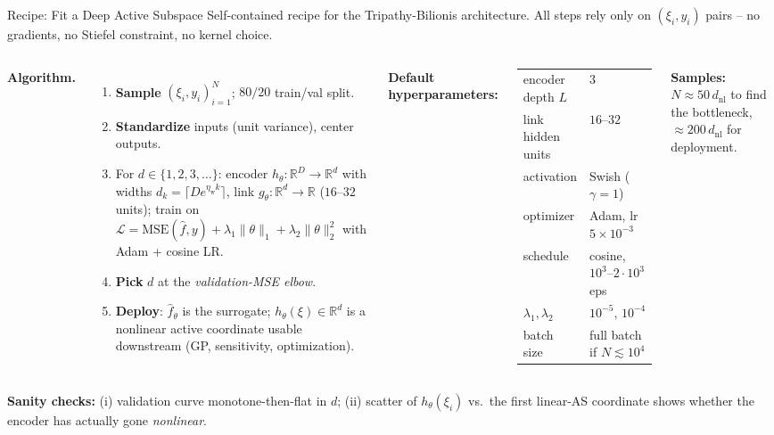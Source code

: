 \documentclass[aspectratio=169,11pt]{beamer}
\newcommand{\emphc}[1]{\textcolor{harvardcrimson}{#1}}
\newcommand{\R}{\mathbb{R}}
\begin{document}
\begin{frame}{Recipe: Fit a Deep Active Subspace}
\scriptsize
Self-contained recipe for the Tripathy-Bilionis architecture. All steps rely only on $(\xi_i, y_i)$ pairs -- no gradients, no Stiefel constraint, no kernel choice.

\vspace{0.2em}
\begin{columns}[T]
\textbf{Algorithm.}
\begin{enumerate}\itemsep1pt
  \item \textbf{Sample} $(\xi_i, y_i)_{i=1}^N$; $80/20$ train/val split.
  \item \textbf{Standardize} inputs (unit variance), center outputs.
  \item For $d \in \{1, 2, 3, \ldots\}$:
    encoder $h_\theta\!: \R^D\!\to\!\R^d$ with widths $d_k = \lceil D e^{\eta_{\mathrm{w}} k}\rceil$, link $g_\theta\!: \R^d\!\to\!\R$ ($16$--$32$ units); train on
    $\mathcal L = \text{MSE}(\hat f, y) + \lambda_1\|\theta\|_1 + \lambda_2\|\theta\|_2^2$ with Adam + cosine LR.
  \item \textbf{Pick} $d$ at the \emph{validation-MSE elbow}.
  \item \textbf{Deploy}: $\hat f_\theta$ is the surrogate; $h_\theta(\xi)\!\in\!\R^d$ is a nonlinear \emphc{active coordinate} usable downstream (GP, sensitivity, optimization).
\end{enumerate}

\textbf{Default hyperparameters:}
\vspace{0.1em}
\begin{center}
\renewcommand{\arraystretch}{1.05}
\tiny
\begin{tabular}{l l}
\toprule
encoder depth $L$ & $3$ \\
link hidden units & $16$--$32$ \\
activation & Swish ($\gamma = 1$) \\
optimizer & Adam, lr $5{\times}10^{-3}$ \\
schedule & cosine, $10^3$--$2{\cdot}10^3$ eps \\
$\lambda_1, \lambda_2$ & $10^{-5},\,10^{-4}$ \\
batch size & full batch if $N \lesssim 10^4$ \\
\bottomrule
\end{tabular}
\end{center}

\vspace{0.1em}
{\tiny \textbf{Samples:} $N \!\approx\! 50\,d_{\mathrm{nl}}$ to find the bottleneck, $\approx 200\,d_{\mathrm{nl}}$ for deployment.}
\end{columns}

\vspace{0.1em}
{\tiny \textbf{Sanity checks:} (i) validation curve monotone-then-flat in $d$; (ii) scatter of $h_\theta(\xi_i)$ vs.\ the first linear-AS coordinate shows whether the encoder has actually gone \emph{nonlinear}.}
\end{frame}
\end{document}
